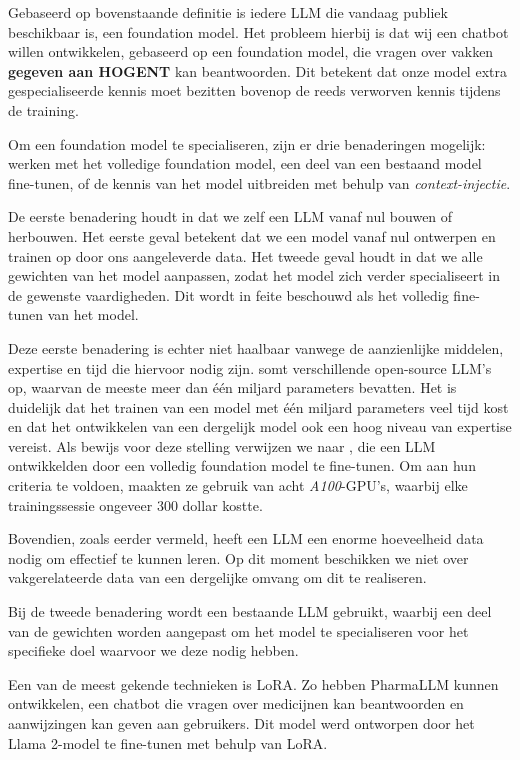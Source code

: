 Gebaseerd op bovenstaande definitie is iedere \acrshort{LLM} die vandaag publiek beschikbaar is, een foundation model. Het probleem hierbij is dat wij een chatbot willen ontwikkelen, gebaseerd op een foundation model, die vragen over vakken \textbf{gegeven aan HOGENT} kan beantwoorden. Dit betekent dat onze model extra gespecialiseerde kennis moet bezitten bovenop de reeds verworven kennis tijdens de training.

Om een foundation model te specialiseren, zijn er drie benaderingen mogelijk: werken met het volledige foundation model, een deel van een bestaand model fine-tunen, of de kennis van het model uitbreiden met behulp van \textit{context-injectie}.

De eerste benadering houdt in dat we zelf een \acrshort{LLM} vanaf nul bouwen of herbouwen. Het eerste geval betekent dat we een model vanaf nul ontwerpen en trainen op door ons aangeleverde data. Het tweede geval houdt in dat we alle gewichten van het model aanpassen, zodat het model zich verder specialiseert in de gewenste vaardigheden. Dit wordt in feite beschouwd als het volledig fine-tunen van het model.

Deze eerste benadering is echter niet haalbaar vanwege de aanzienlijke middelen, expertise \autocite{Naveed2023} en tijd die hiervoor nodig zijn. \textcite{Fourrier2024} somt verschillende open-source \acrshort{LLM}'s op, waarvan de meeste meer dan één miljard parameters bevatten. Het is duidelijk dat het trainen van een model met één miljard parameters veel tijd kost en dat het ontwikkelen van een dergelijk model ook een hoog niveau van expertise vereist. Als bewijs voor deze stelling verwijzen we naar \textcite{Chiang2023}, die een \acrshort{LLM} ontwikkelden door een volledig foundation model te fine-tunen. Om aan hun criteria te voldoen, maakten ze gebruik van acht \textit{A100}-GPU’s, waarbij elke trainingssessie ongeveer 300 dollar kostte.

Bovendien, zoals eerder vermeld, heeft een \acrshort{LLM} een enorme hoeveelheid data nodig om effectief te kunnen leren. Op dit moment beschikken we niet over vakgerelateerde data van een dergelijke omvang om dit te realiseren.

Bij de tweede benadering wordt een bestaande \acrshort{LLM} gebruikt, waarbij een deel van de gewichten worden aangepast om het model te specialiseren voor het specifieke doel waarvoor we deze nodig hebben.

Een van de meest gekende technieken is \acrfull{LoRA}. Zo hebben \textcite{Azam2024} PharmaLLM kunnen ontwikkelen, een chatbot die vragen over medicijnen kan beantwoorden en aanwijzingen kan geven aan gebruikers. Dit model werd ontworpen door het Llama 2-model te fine-tunen met behulp van \acrshort{LoRA}. 

